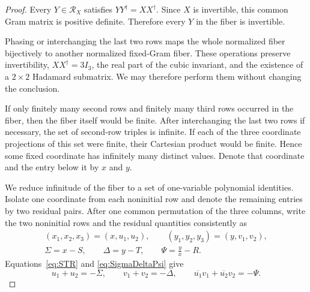 \documentclass[aps,prx,reprint,nofootinbib,twoside,superscriptaddress,longbibliography,floatfix]{revtex4-2}
\theoremstyle{definition}
\begin{document}
\begin{proof}
{Every $Y\in\mathcal R_X$ satisfies $YY^{\dagger}=XX^{\dagger}$. Since $X$ is invertible, this common Gram matrix is positive definite. Therefore every $Y$ in the fiber is invertible.}

Phasing or interchanging the last two rows maps the whole normalized fiber bijectively to another normalized fixed-Gram fiber.  These operations preserve invertibility, $XX^{\dagger}=3I_3$, the real part of the cubic invariant, and the existence of a $2\times2$ Hadamard submatrix.  We may therefore perform them without changing the conclusion.

If only finitely many second rows and finitely many third rows occurred in the fiber, then the fiber itself would be finite.  After interchanging the last two rows if necessary, the set of second-row triples is infinite.  If each of the three coordinate projections of this set were finite, their Cartesian product would be finite.  Hence some fixed coordinate has infinitely many distinct values.  Denote that coordinate and the entry below it by $x$ and $y$.


We reduce infinitude of the fiber to a set of one-variable polynomial identities. Isolate one coordinate from each noninitial row and denote the remaining entries by two residual pairs. After one common permutation of the three columns, write the two noninitial rows and the residual quantities consistently as
\begin{equation}
\begin{gathered}
(x_1,x_2,x_3)=(x,u_1,u_2),\qquad
(y_1,y_2,y_3)=(y,v_1,v_2),\\
\Sigma=x-S,\qquad \Delta=y-T,\qquad
\Psi=\frac{y}{x}-R.
\end{gathered}
\label{eq:SigmaDeltaPsi}
\end{equation}
Equations~\eqref{eq:STR} and \eqref{eq:SigmaDeltaPsi} give
\begin{equation}
u_1+u_2=-\Sigma,
\qquad v_1+v_2=-\Delta,
\qquad
\overline{u_1}v_1+\overline{u_2}v_2=-\Psi.
\label{eq:residualsums}
\end{equation}


\end{proof}
\end{document}
